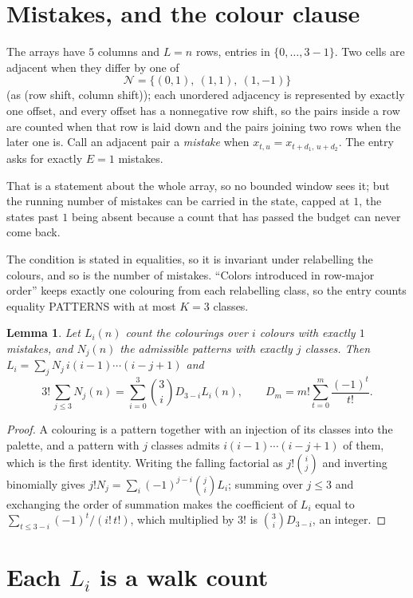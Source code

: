 \documentclass[11pt,a4paper]{article}
\theoremstyle{plain}
\newtheorem{lemma}[theorem]{Lemma}
\theoremstyle{definition}
\begin{document}
\section{Mistakes, and the colour clause}

The arrays have $5$ columns and $L=n$ rows, entries in $\{0,\dots,3-1\}$.
Two cells are adjacent when they differ by one of
\[
\mathcal N=\{(0,1),\ (1,1),\ (1,-1)\}
\]
(as (row shift, column shift)); each unordered adjacency is represented by exactly one
offset, and every offset has a nonnegative row shift, so the pairs inside a row are
counted when that row is laid down and the pairs joining two rows when the later one
is. Call an adjacent pair a \emph{mistake} when $x_{t,u}=x_{t+d_1,\,u+d_2}$. The entry asks for exactly
$E=1$ mistakes.

That is a statement about the whole array, so no bounded window sees it; but the running
number of mistakes can be carried in the state, capped at $1$, the states past $1$ being
absent because a count that has passed the budget can never come back.

The condition is stated in equalities, so it is invariant under relabelling the colours, and
so is the number of mistakes. ``Colors introduced in row-major order'' keeps exactly one
colouring from each relabelling class, so the entry counts equality PATTERNS with at most
$K=3$ classes.

\begin{lemma}\label{lem:inv}
Let $L_i(n)$ count the colourings over $i$ colours with exactly $1$ mistakes, and $N_j(n)$
the admissible patterns with exactly $j$ classes. Then
$L_i=\sum_j N_j\,i(i-1)\cdots(i-j+1)$ and
\[
3!\,\sum_{j\le3}N_j(n)=\sum_{i=0}^{3}\binom{3}{i}D_{3-i}L_i(n),
\qquad D_m=m!\sum_{t=0}^{m}\frac{(-1)^t}{t!} .
\]
\end{lemma}

\begin{proof}
A colouring is a pattern together with an injection of its classes into the palette, and a
pattern with $j$ classes admits $i(i-1)\cdots(i-j+1)$ of them, which is the first identity.
Writing the falling factorial as $j!\binom{i}{j}$ and inverting binomially gives
$j!N_j=\sum_i(-1)^{j-i}\binom{j}{i}L_i$; summing over $j\le3$ and exchanging the order
of summation makes the coefficient of $L_i$ equal to $\sum_{t\le3-i}(-1)^t/(i!\,t!)$,
which multiplied by $3!$ is $\binom{3}{i}D_{3-i}$, an integer.
\end{proof}

\section{Each $L_i$ is a walk count}
\end{document}
